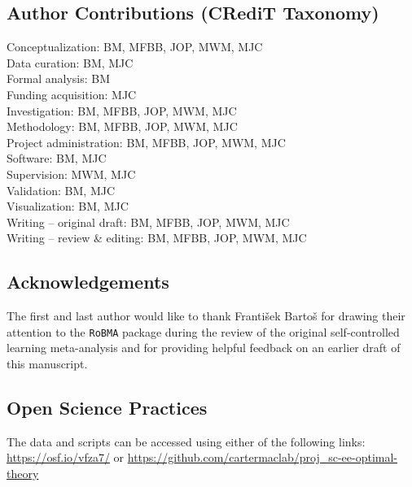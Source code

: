 \documentclass[
  man, donotrepeattitle,floatsintext]{apa7}
\begin{document}
\vspace{3em}

\hypertarget{author-contributions-credit-taxonomy}{%
\subsection{Author Contributions (CRediT Taxonomy)}\label{author-contributions-credit-taxonomy}}

\noindent Conceptualization: BM, MFBB, JOP, MWM, MJC\\
\noindent Data curation: BM, MJC\\
\noindent Formal analysis: BM\\
\noindent Funding acquisition: MJC\\
\noindent Investigation: BM, MFBB, JOP, MWM, MJC\\
\noindent Methodology: BM, MFBB, JOP, MWM, MJC\\
\noindent Project administration: BM, MFBB, JOP, MWM, MJC\\
\noindent Software: BM, MJC\\
\noindent Supervision: MWM, MJC\\
\noindent Validation: BM, MJC\\
\noindent Visualization: BM, MJC\\
\noindent Writing -- original draft: BM, MFBB, JOP, MWM, MJC\\
\noindent Writing -- review \& editing: BM, MFBB, JOP, MWM, MJC

\hypertarget{acknowledgements}{%
\subsection{Acknowledgements}\label{acknowledgements}}

\noindent The first and last author would like to thank František Bartoš for drawing their attention to the \texttt{RoBMA} package during the review of the original self-controlled learning meta-analysis and for providing helpful feedback on an earlier draft of this manuscript.

\hypertarget{open-science-practices}{%
\subsection{Open Science Practices}\label{open-science-practices}}

\noindent The data and scripts can be accessed using either of the following links: \url{https://osf.io/vfza7/} or \url{https://github.com/cartermaclab/proj_sc-ee-optimal-theory}
\end{document}
